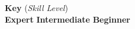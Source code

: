 \begin{center}
\begin{minipage}{0.6\textwidth}
	\begin{center}{\large\textbf{Key}} (\textit{Skill Level}) \\ 
	\highskillbw \textbf{Expert}
	\medskillbw \textbf{Intermediate}
	\lowskillbw \textbf{Beginner} 
	\end{center}
\end{minipage}
\end{center}
